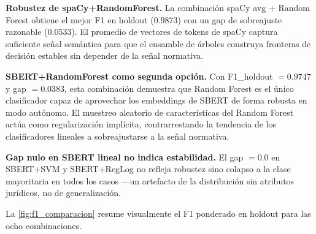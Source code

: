 \textbf{Robustez de spaCy+RandomForest.} La combinación spaCy avg +
Random Forest obtiene el mejor F1 en holdout ($0.9873$) con un gap de
sobreajuste razonable ($0.0533$). El promedio de vectores de tokens de
spaCy captura suficiente señal semántica para que el ensamble de árboles
construya fronteras de decisión estables sin depender de la señal normativa.

\textbf{SBERT+RandomForest como segunda opción.} Con F1\_holdout $= 0.9747$
y gap $= 0.0383$, esta combinación demuestra que Random Forest es el único
clasificador capaz de aprovechar los embeddings de SBERT de forma robusta
en modo autónomo. El muestreo aleatorio de características del Random Forest
actúa como regularización implícita, contrarrestando la tendencia de los
clasificadores lineales a sobreajustarse a la señal normativa.

\textbf{Gap nulo en SBERT lineal no indica estabilidad.} El gap $= 0.0$
en SBERT+SVM y SBERT+RegLog no refleja robustez sino colapso a la clase
mayoritaria en todos los casos —un artefacto de la distribución sin
atributos jurídicos, no de generalización.


La \cref{fig:f1_comparacion} resume visualmente el F1 ponderado en holdout
para las ocho combinaciones.

